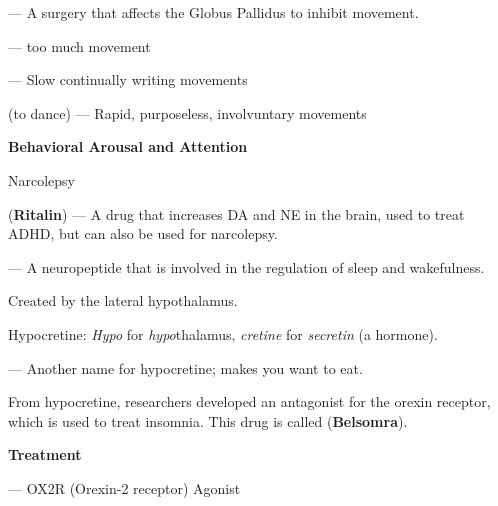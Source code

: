 \begin{coloredlist}
\begin{coloredlist}
\begin{coloredlist}
            \item {} — A surgery that affects the Globus Pallidus to inhibit movement.
        \end{coloredlist}
        \item {} — too much movement
        \begin{coloredlist}
            \item {} — Slow continually writing movements
            \item {} (to dance) — Rapid, purposeless, involvuntary movements
        \end{coloredlist}
    \end{coloredlist}
    \item \textbf{Behavioral Arousal and Attention}
    \begin{coloredlist}
        \item Narcolepsy
        \begin{coloredlist}
            \item {} (\textbf{Ritalin}) — A drug that increases DA and NE in the brain, used to treat ADHD, but can also be used for narcolepsy.
            \item {} — A neuropeptide that is involved in the regulation of sleep and wakefulness.
            \begin{coloredlist}
                \item Created by the lateral hypothalamus.
                \item Hypocretine: \textit{Hypo} for \textit{hypo}thalamus, \textit{cretine} for \textit{secretin} (a hormone).
                \item {} — Another name for hypocretine; makes you want to eat.
            \end{coloredlist}
            \item From hypocretine, researchers developed an antagonist for the orexin receptor, which is used to treat insomnia. This drug is called  (\textbf{Belsomra}).
            \item \textbf{Treatment}
            \begin{coloredlist}
                \item {} — OX2R (Orexin-2 receptor) Agonist

\end{coloredlist}
\end{coloredlist}
\end{coloredlist}
\end{coloredlist}
